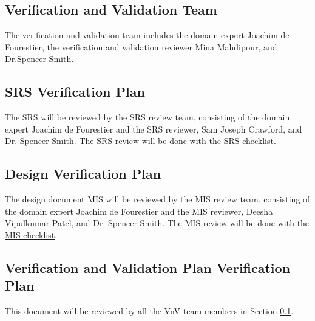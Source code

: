 \documentclass[12pt, titlepage]{article}
\begin{document}

\subsection{Verification and Validation Team} \label{sec:VnV_team}


The verification and validation team includes the domain expert Joachim de Fourestier, the verification and validation reviewer Mina Mahdipour, and Dr.Spencer Smith.

\subsection{SRS Verification Plan}

The SRS will be reviewed by the SRS review team, consisting of the domain expert Joachim de Fourestier and the SRS reviewer, Sam Joseph Crawford, and Dr. Spencer Smith. 
The SRS review will be done with the \href{https://github.com/LesleyWheat/CAS741_CEWS/blob/main/docs/Checklists/SRS-Checklist.pdf}{SRS checklist}.

\subsection{Design Verification Plan}

The design document MIS will be reviewed by the MIS review team, consisting of the domain expert Joachim de Fourestier and the MIS reviewer, Deesha Vipulkumar Patel, and Dr. Spencer Smith.
The MIS review will be done with the \href{https://github.com/LesleyWheat/CAS741_CEWS/blob/main/docs/Checklists/MIS-Checklist.pdf}{MIS checklist}.

\subsection{Verification and Validation Plan Verification Plan}

This document will be reviewed by all the VnV team members in Section \ref{sec:VnV_team}.

\end{document}
